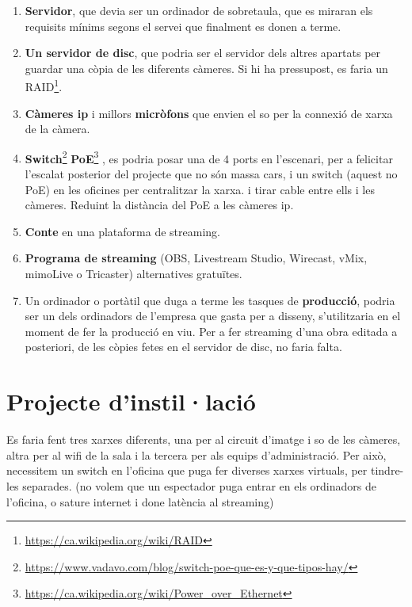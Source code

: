 \documentclass[
  10pt,
]{krantz}
\DeclareRobustCommand{\href}[2]{#2\footnote{\url{#1}}}
\begin{document}
\begin{enumerate}
\def\labelenumi{\arabic{enumi}.}
\item
  \textbf{Servidor}, que devia ser un ordinador de sobretaula, que es miraran els requisits mínims segons el servei que finalment es donen a terme.
\item
  \textbf{Un servidor de disc}, que podria ser el servidor dels altres apartats per guardar una còpia de les diferents càmeres. Si hi ha pressupost, es faria un \href{https://ca.wikipedia.org/wiki/RAID}{RAID}.
\item
  \textbf{Càmeres ip} i millors \textbf{micròfons} que envien el so per la connexió de xarxa de la càmera.
\item
  \href{https://www.vadavo.com/blog/switch-poe-que-es-y-que-tipos-hay/}{\textbf{Switch}} \href{https://ca.wikipedia.org/wiki/Power_over_Ethernet}{\textbf{PoE}} , es podria posar una de 4 ports en l'escenari, per a felicitar l'escalat posterior del projecte que no són massa cars, i un switch (aquest no PoE) en les oficines per centralitzar la xarxa. i tirar cable entre ells i les càmeres. Reduint la distància del PoE a les càmeres ip.
\item
  \textbf{Conte} en una plataforma de streaming.
\item
  \textbf{Programa de streaming} (OBS, Livestream Studio, Wirecast, vMix, mimoLive o Tricaster) alternatives gratuïtes.
\item
  Un ordinador o portàtil que duga a terme les tasques de \textbf{producció}, podria ser un dels ordinadors de l'empresa que gasta per a disseny, s'utilitzaria en el moment de fer la producció en viu. Per a fer streaming d'una obra editada a posteriori, de les còpies fetes en el servidor de disc, no faria falta.
\end{enumerate}

\hypertarget{projecte-dinstillaciuxf3}{%
\section{Projecte d'instil·lació}\label{projecte-dinstillaciuxf3}}

Es faria fent tres xarxes diferents, una per al circuit d'imatge i so de les càmeres, altra per al wifi de la sala i la tercera per als equips d'administració. Per això, necessitem un switch en l'oficina que puga fer diverses xarxes virtuals, per tindre-les separades. (no volem que un espectador puga entrar en els ordinadors de l'oficina, o sature internet i done latència al streaming)
\end{document}
